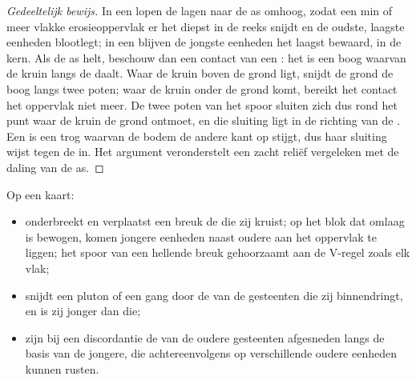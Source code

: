 \begin{proof}[Gedeeltelijk bewijs]
In een  lopen de lagen naar de as omhoog, zodat een min of meer vlakke erosieoppervlak
er het diepst in de reeks snijdt en de oudste, laagste eenheden blootlegt; in een  blijven
de jongste eenheden het laagst bewaard, in de kern. Als de as helt, beschouw dan een contact van een
: het is een boog waarvan de kruin langs de  daalt. Waar de kruin boven de grond
ligt, snijdt de grond de boog langs twee poten; waar de kruin onder de grond komt, bereikt het contact
het oppervlak niet meer. De twee poten van het spoor sluiten zich dus rond het punt waar de kruin de
grond ontmoet, en die sluiting ligt in de richting van de . Een  is een trog waarvan de
bodem de andere kant op stijgt, dus haar sluiting wijst tegen de  in. Het argument veronderstelt
een zacht reliëf vergeleken met de daling van de as.
\end{proof}

\begin{proposition}\label{prop:b1:geological-maps:cuts}
Op een kaart:
\begin{itemize}
  \item onderbreekt en verplaatst een breuk de  die zij kruist; op het blok dat omlaag is
        bewogen, komen jongere eenheden naast oudere aan het oppervlak te liggen; het spoor van een
        hellende breuk gehoorzaamt aan de V-regel zoals elk vlak;
  \item snijdt een pluton of een gang door de  van de gesteenten die zij binnendringt, en is
        zij jonger dan die;
  \item zijn bij een discordantie de  van de oudere gesteenten afgesneden langs de basis van de
        jongere, die achtereenvolgens op verschillende oudere eenheden kunnen rusten.
\end{itemize}
\end{proposition}

